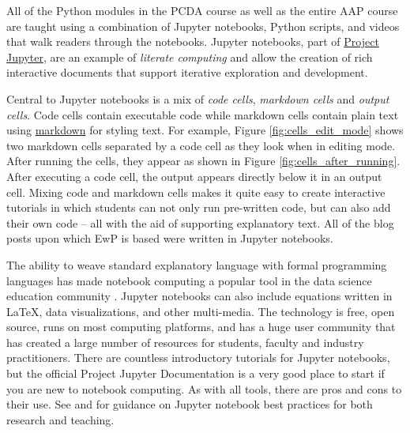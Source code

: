 \documentclass[ited,blindrev]{informs3}              %
\begin{document}
All of the Python modules in the PCDA course as well as the entire AAP course are taught using a combination of Jupyter notebooks, Python scripts, and videos that walk readers through the notebooks. Jupyter notebooks, part of \href{https://jupyter.org/}{Project Jupyter}, are an example of \textit{literate computing} \citep{perez2015project} and allow the creation of rich interactive documents that support iterative exploration and development. 

Central to Jupyter notebooks is a mix of \textit{code cells}, \textit{markdown cells} and \textit{output cells}. Code cells contain executable code while markdown cells contain plain text using \href{URL}{markdown} for styling text. For example, Figure \ref{fig:cells_edit_mode} shows two markdown cells separated by a code cell as they look when in editing mode. After running the cells, they appear as shown in Figure \ref{fig:cells_after_running}. After executing a code cell, the output appears directly below it in an output cell. Mixing code and markdown cells makes it quite easy to create interactive tutorials in which students can not only run pre-written code, but can also add their own code -- all with the aid of supporting explanatory text. All of the blog posts upon which EwP is based were written in Jupyter notebooks. 

The ability to weave standard explanatory language with formal programming languages has made notebook computing a popular tool in the data science education community \citep{perkel2018jupyter}. Jupyter notebooks can also include equations written in \LaTeX, data visualizations, and other multi-media. The technology is free, open source, runs on most computing platforms, and has a huge user community that has created a large number of resources for students, faculty and industry practitioners. There are countless introductory tutorials for Jupyter notebooks, but the official Project Jupyter Documentation \citep{jupyterteamProjectJupyterDocumentation2015} is a very good place to start if you are new to notebook computing. As with all tools, there are pros and cons to their use. See \citet{rule2018ten, barba2019teaching} and \citet{johnson2020benefits} for guidance on Jupyter notebook best practices for both research and teaching.
\end{document}
